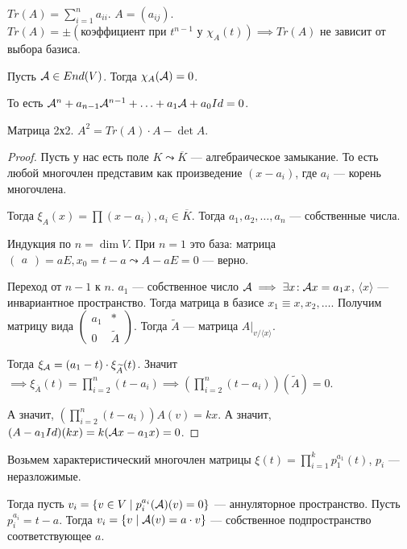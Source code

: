 \begin{definition}
    $Tr(A) = \sum\limits_{i=1}^n a_{ii}$.  $A = (a_{ij})$.  $Tr(A) = \pm(\text{коэффициент при }t^{n-1}\text{ у }\chi_{A}(t)) \implies Tr(A)$ не зависит от выбора базиса.
\end{definition}
\begin{theorem}
    Пусть $\mathcal{A} \in End(V)$. Тогда  $\chi_A(\mathcal{A})=0$. 
    
    То есть $\mathcal{A}^n + a_{n-1}\mathcal{A}^{n-1} + \ldots + a_1 \mathcal{A} + a_0Id = 0$.
    \begin{example}
        Матрица 2х2. $A^2 = Tr(A) \cdot A - \det A$.
    \end{example}
\end{theorem}
\begin{proof}
    Пусть у нас есть поле $K \leadsto \overline{K}$ --- алгебраическое замыкание.  То есть любой многочлен представим как произведение  $(x-a_i)$, где  $a_i$ --- корень многочлена.

    Тогда $\xi_A(x) = \prod (x- a_i), a_i \in \overline{K}$. Тогда  $a_1, a_2,\ldots,a_n$ --- собственные числа.

    Индукция по $n = \dim V$. При  $n=1$ это база: матрица  $\begin{pmatrix} a \end{pmatrix} = aE, x_0 = t - a \leadsto A-aE = 0$ --- верно.

    Переход от  $n-1$ к $n$. $a_1$ --- собственное число  $\mathcal{A} \implies \exists x\!: \mathcal{A} x = a_1x$,  $\langle x \rangle$ --- инвариантное пространство. Тогда матрица в базисе $x_1 \equiv x, x_2, \ldots$. Получим матрицу вида $\left(\begin{array}{c|c} a_1 & * \\ \hline 0 & \widetilde{A} \end{array} \right)$. Тогда  $\widetilde{A}$ --- матрица  $A \Big|_{v / \langle x \rangle}$. 

    Тогда  $\xi_{\mathcal{A}} = (a_1 - t) \cdot \xi_{\widetilde{A}}(t)$. Значит  $\implies \xi_{\overline{A}}(t) = \prod\limits_{i=2}^n (t-a_i) \implies (\prod_{i=2}^n (t-a_i))(\widetilde{A}) = 0$.

    А значит, $(\prod\limits_{i=2}^n (t-a_i))A(v) = kx$. А значит,  $(A - a_1Id)(kx) = k(\mathcal{A} x - a_1x) = 0$.
\end{proof}

Возьмем характеристический многочлен матрицы $\xi(t) = \prod_{i=1}^k p_1^{a_1}(t)$,  $p_i$ --- неразложимые.

Тогда пусть  $v_i = \{v \in V \mid p_i^{a_i}(\mathcal{A})(v) = 0\}$ --- аннуляторное пространство. Пусть  $p_i^{a_i} = t - a$. Тогда  $v_i = \{v \mid \mathcal{A}(v) = a \cdot v\}$ --- собственное подпространство соответствующее $a$. 

